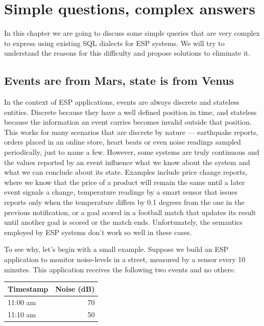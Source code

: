 \documentclass{report}
\begin{document}
\chapter{Simple questions, complex answers}
\label{chap:simple-questions-complex-answers}

In this chapter we are going to discuss some simple queries that are
very complex to express using existing SQL dialects for ESP
systems. We will try to understand the reasons for this difficulty and
propose solutions to eliminate it.

\section{Events are from Mars, state is from Venus}
\label{sec:acme-problem}


In the context of ESP applications, events are always discrete and
stateless entities. Discrete because they have a well defined position
in time, and stateless because the information an event carries
becomes invalid outside that position. This works for many scenarios
that are discrete by nature --- earthquake reports, orders placed in
an online store, heart beats or even noise readings sampled
periodically, just to name a few. However, some systems are truly
continuous and the values reported by an event influence what we know
about the system and what we can conclude about its state. Examples
include price change reports, where we know that the price of a
product will remain the same until a later event signals a change,
temperature readings by a smart sensor that issues reports only when
the temperature differs by 0.1 degrees from the one in the previous
notification, or a goal scored in a football match that updates its
result until another goal is scored or the match ends. Unfortunately,
the semantics employed by ESP systems don't work so well in these
cases.

To see why, let's begin with a small example. Suppose we build an ESP
application to monitor noise-levels in a street, measured by a sensor
every 10 minutes. This application receives the following two events
and no others:

\begin{tabular}{ |l|r| }
  \hline
  Timestamp & Noise (dB) \\
  \hline
  11:00 am & 70 \\
  11:10 am & 50 \\
  \hline
\end{tabular}
\end{document}
